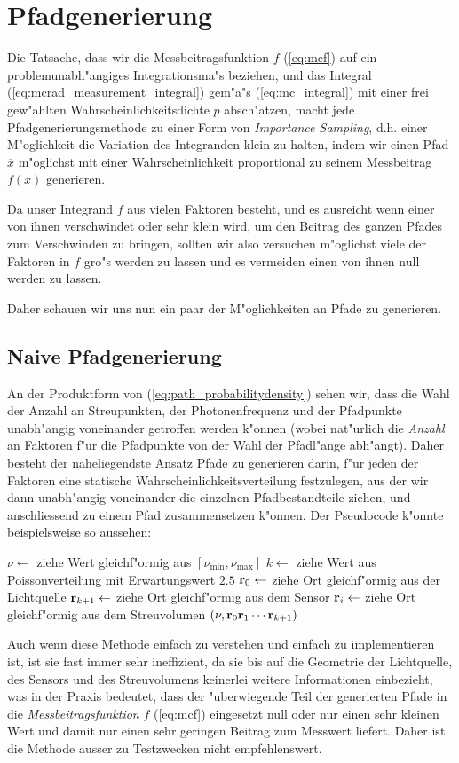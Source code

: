 	\section{Pfadgenerierung}
	Die Tatsache, dass wir die Messbeitragsfunktion $f$ (\ref{eq:mcf}) auf ein problemunabh"angiges Integrationsma"s beziehen, und das Integral (\ref{eq:mcrad_measurement_integral}) gem"a"s (\ref{eq:mc_integral}) mit einer frei gew"ahlten Wahrscheinlichkeitsdichte $p$ absch"atzen, macht jede Pfadgenerierungsmethode zu einer Form von {\em Importance Sampling}, d.h. einer M"oglichkeit die Variation des Integranden klein zu halten, indem wir einen Pfad ${\overline x}$ m"oglichst mit einer Wahrscheinlichkeit proportional zu seinem Messbeitrag $f({\overline x})$ generieren.
	
	Da unser Integrand $f$ aus vielen Faktoren besteht, und es ausreicht wenn einer von ihnen verschwindet oder sehr klein wird, um den Beitrag des ganzen Pfades zum Verschwinden zu bringen, sollten wir also versuchen m"oglichst viele der Faktoren in $f$ gro"s werden zu lassen und es vermeiden einen von ihnen null werden zu lassen.
	
	Daher schauen wir uns nun ein paar der M"oglichkeiten an Pfade zu generieren.
	\subsection{Naive Pfadgenerierung}
	An der Produktform von (\ref{eq:path_probabilitydensity}) sehen wir, dass die Wahl der Anzahl an Streupunkten, der Photonenfrequenz und der Pfadpunkte unabh"angig voneinander getroffen werden k"onnen (wobei nat"urlich die {\em Anzahl} an Faktoren f"ur die Pfadpunkte von der Wahl der Pfadl"ange abh"angt). Daher besteht der naheliegendste Ansatz Pfade zu generieren darin, f"ur jeden der Faktoren eine statische Wahrscheinlichkeitsverteilung festzulegen, aus der wir dann unabh"angig voneinander die einzelnen Pfadbestandteile ziehen, und anschliessend zu einem Pfad zusammensetzen k"onnen. Der Pseudocode k"onnte beispielsweise so aussehen:
	\begin{algorithmic}
		\STATE $\nu \leftarrow$ ziehe Wert gleichf"ormig aus $[\nu_\text{min},\nu_\text{max}]$
		\STATE $k \leftarrow$ ziehe Wert aus Poissonverteilung mit Erwartungswert $2.5$
		\STATE $\mathbf{r}_0 \leftarrow$ ziehe Ort gleichf"ormig aus der Lichtquelle
		\STATE $\mathbf{r}_{k+1} \leftarrow$ ziehe Ort gleichf"ormig aus dem Sensor
			\STATE $\mathbf{r}_i \leftarrow$ ziehe Ort gleichf"ormig aus dem Streuvolumen
	  \ENDFOR
	  \RETURN $(\nu,\mathbf{r}_0\mathbf{r}_1\cdots\mathbf{r}_{k+1})$
	\end{algorithmic}
	Auch wenn diese Methode einfach zu verstehen und einfach zu implementieren ist, ist sie fast immer sehr ineffizient, da sie bis auf die Geometrie der Lichtquelle, des Sensors und des Streuvolumens keinerlei weitere Informationen einbezieht, was in der Praxis bedeutet, dass der "uberwiegende Teil der generierten Pfade in die {\em Messbeitragsfunktion} $f$ (\ref{eq:mcf}) eingesetzt null oder nur einen sehr kleinen Wert und damit nur einen sehr geringen Beitrag zum Messwert liefert. Daher ist die Methode ausser zu Testzwecken nicht empfehlenswert.
	

